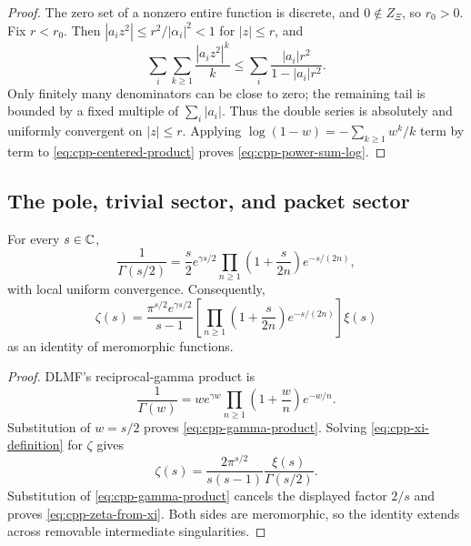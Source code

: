 \begin{proof}
The zero set of a nonzero entire function is discrete, and \(0\notin Z_\Xi\),
so \(r_0>0\).  Fix \(r<r_0\).  Then
\(|a_i z^2|\leq r^2/|\alpha_i|^2<1\) for \(|z|\leq r\), and
\[
 \sum_i\sum_{k\geq1}\frac{|a_i z^2|^k}{k}
 \leq
 \sum_i\frac{|a_i|r^2}{1-|a_i|r^2}.
\]
Only finitely many denominators can be close to zero; the remaining tail is
bounded by a fixed multiple of \(\sum_i|a_i|\).  Thus the double series is
absolutely and uniformly convergent on \(|z|\leq r\).  Applying
\(\log(1-w)=-\sum_{k\geq1}w^k/k\) term by term to
\cref{eq:cpp-centered-product} proves \eqref{eq:cpp-power-sum-log}.
\end{proof}

\subsection{The pole, trivial sector, and packet sector}

\begin{proposition}
\label{prop:cpp-reciprocal-gamma}
For every \(s\in\mathbb C\),
\begin{equation}
\label{eq:cpp-gamma-product}
 \frac1{\Gamma(s/2)}
 =
 \frac{s}{2}e^{\gamma s/2}
 \prod_{n\geq1}
 \left(1+\frac{s}{2n}\right)e^{-s/(2n)},
\end{equation}
with local uniform convergence.  Consequently,
\begin{equation}
\label{eq:cpp-zeta-from-xi}
 \zeta(s)
 =
 \frac{\pi^{s/2}e^{\gamma s/2}}{s-1}
 \left[
 \prod_{n\geq1}
 \left(1+\frac{s}{2n}\right)e^{-s/(2n)}
 \right]\xi(s)
\end{equation}
as an identity of meromorphic functions.
\end{proposition}

\begin{proof}
DLMF's reciprocal-gamma product
\cite[\S5.8, Eq.~5.8.2]{askeyRoyDLMF5} is
\[
 \frac1{\Gamma(w)}
 =
 we^{\gamma w}\prod_{n\geq1}
 \left(1+\frac wn\right)e^{-w/n}.
\]
Substitution of \(w=s/2\) proves \eqref{eq:cpp-gamma-product}.  Solving
\eqref{eq:cpp-xi-definition} for \(\zeta\) gives
\[
 \zeta(s)
 =
 \frac{2\pi^{s/2}}{s(s-1)}
 \frac{\xi(s)}{\Gamma(s/2)}.
\]
Substitution of \eqref{eq:cpp-gamma-product} cancels the displayed factor
\(2/s\) and proves \eqref{eq:cpp-zeta-from-xi}.  Both sides are meromorphic,
so the identity extends across removable intermediate singularities.
\end{proof}

